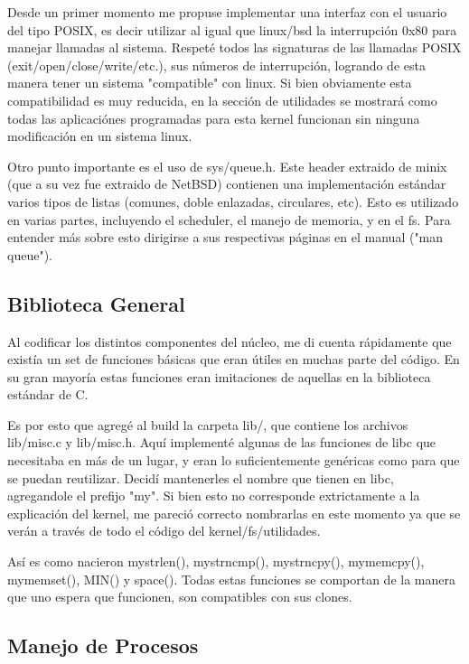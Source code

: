 Desde un primer momento me propuse implementar una interfaz con el usuario del
tipo POSIX, es decir utilizar al igual que linux/bsd la interrupción 0x80 para
manejar llamadas al sistema. Respeté todos las signaturas de las llamadas POSIX
(exit/open/close/write/etc.), sus números de interrupción, logrando de esta
manera tener un sistema "compatible" con linux. Si bien obviamente esta
compatibilidad es muy reducida, en la sección de utilidades se mostrará como
todas las aplicaciónes programadas para esta kernel funcionan sin ninguna
modificación en un sistema linux.

Otro punto importante es el uso de sys/queue.h. Este header extraido de minix
(que a su vez fue extraido de NetBSD) contienen una implementación estándar
varios tipos de listas (comunes, doble enlazadas, circulares, etc). Esto es
utilizado en varias partes, incluyendo el scheduler, el manejo de memoria, y en
el fs. Para entender más sobre esto dirigirse a sus respectivas páginas en el
manual ("man queue").

\subsection{Biblioteca General}

Al codificar los distintos componentes del núcleo, me di cuenta rápidamente que
existía un set de funciones básicas que eran útiles en muchas parte del código.
En su gran mayoría estas funciones eran imitaciones de aquellas en la
biblioteca estándar de C.

Es por esto que agregé al build la carpeta lib/, que contiene los archivos
lib/misc.c y lib/misc.h. Aquí implementé algunas de las funciones de libc que
necesitaba en más de un lugar, y eran lo suficientemente genéricas como para
que se puedan reutilizar. Decidí mantenerles el nombre que tienen en libc,
agregandole el prefijo "my". Si bien esto no corresponde extrictamente a la
explicación del kernel, me pareció correcto nombrarlas en este momento ya que
se verán a través de todo el código del kernel/fs/utilidades.

Así es como nacieron mystrlen(), mystrncmp(), mystrncpy(), mymemcpy(),
mymemset(), MIN() y space(). Todas estas funciones se comportan de la manera
que uno espera que funcionen, son compatibles con sus clones.

\subsection{Manejo de Procesos}

